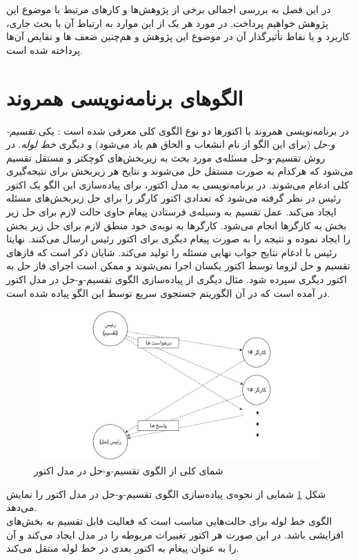 در این فصل به بررسی اجمالی برخی از پژوهش‌ها و کارهای مرتبط با موضوع این پژوهش خواهیم پرداخت. در مورد هر یک از این موارد به ارتباط آن با بحث جاری، کاربرد و یا نقاط تأثیرگذار آن در موضوع این پژوهش و هم‌چنین ضعف ها و نقایص آن‌ها پرداخته شده است. 
\section{الگوهای برنامه‌نویسی همروند}
\label{section:actorPatterns}
در برنامه‌نویسی همروند با اکتور‌ها دو نوع الگوی کلی معرفی شده است \cite{Agha1990}: یکی  \textit{\gls{تقسیم-و-حل}} (برای این الگو از نام انشعاب و الحاق هم  یاد می‌شود) و دیگری \textit{\gls{خط لوله}}. 
در روش تقسیم-و-حل مسئله‌ی مورد بحث به زیربخش‌های کوچکتر و مستقل تقسیم می‌شود که هرکدام به صورت مستقل حل می‌شوند و نتایج هر زیربخش برای نتیجه‌گیری کلی ادغام می‌شوند. در برنامه‌نویسی به مدل اکتور، برای پیاده‌سازی این الگو یک اکتور رئیس در نظر گرفته می‌شود که تعدادی اکتور کارگر را برای حل زیربخش‌های مسئله ایجاد می‌کند. عمل تقسیم به وسیله‌ی فرستادن پیغام‌ حاوی حالت لازم برای حل زیر بخش به کارگر‌ها انجام می‌شود. کارگرها به نوبه‌ی خود منطق لازم برای حل زیر بخش را ایجاد نموده و نتیجه را به صورت پیغام دیگری برای اکتور رئیس ارسال می‌کنند. نهایتا رئیس با ادغام نتایج جواب نهایی 
مسئله را تولید می‌کند. شایان ذکر است که فازهای تقسیم و حل لزوما توسط اکتور یکسان اجرا نمی‌شوند و ممکن است اجرای فاز حل به اکتور دیگری سپرده شود. مثال دیگری از پیاده‌سازی الگوی تقسیم-و-حل در مدل اکتور  در \cite{Feng08scalablemodels} آمده است که در آن الگوریتم جستجوی سریع توسط این الگو پیاده شده است.
\begin{figure}
    \begin{center}
	\includegraphics[width=16cm]{3-RelatedWork/Figures/Divide_and_Conquer.pdf}
    \end{center}
    \caption{\label{fig:divide_conquer}  شمای کلی از الگوی تقسیم-و-حل در مدل اکتور }
\end{figure}
شکل \ref{fig:divide_conquer} شمایی از نحوه‌ی پیاده‌سازی الگوی تقسیم-و-حل در مدل اکتور را نمایش می‌دهد.\\
الگوی خط لوله برای حالت‌هایی مناسب است که فعالیت قابل تقسیم به بخش‌های افزایشی باشد. در این صورت هر اکتور تغییرات مربوطه را در مدل ایجاد می‌کند و آن را به عنوان پیغام به اکتور بعدی در خط لوله منتقل می‌کند.

